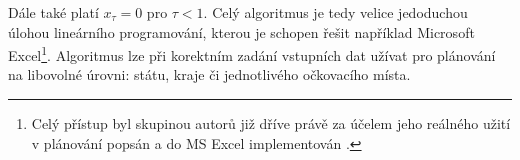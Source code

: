 %


Dále také platí $x_{\tau}=0$ pro $\tau<1$.
Celý algoritmus je tedy velice jedoduchou úlohou lineárního programování, kterou je schopen řešit například Microsoft Excel\footnote{Celý přístup byl skupinou autorů již dříve právě za účelem jeho reálného užití v plánování popsán a do MS Excel implementován \cite{calc_blog}.}. Algoritmus lze při korektním zadání vstupních dat užívat pro plánování na libovolné úrovni: státu, kraje či jednotlivého očkovacího místa. 



